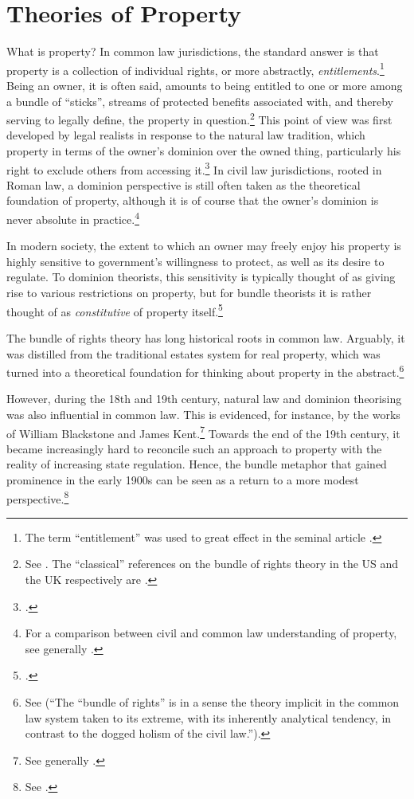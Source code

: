 \section{Theories of Property}\label{sec:top}

What is property? In common law jurisdictions, the standard answer is that property is a collection of individual rights, or more abstractly, {\it entitlements}.\footnote{The term ``entitlement'' was used to great effect in the seminal article \cite{calabresi72}.} Being an owner, it is often said, amounts to being entitled to one or more among a bundle of ``sticks'', streams of protected benefits associated with, and thereby serving to legally define, the property in question.\footnote{See \cite[357-358]{merrill01}. The ``classical'' references on the bundle of rights theory in the US and the UK respectively are \cite{hohfeld17,honore61}.} This point of view was first developed by legal realists in response to the natural law tradition, which  property in terms of the owner's dominion over the owned thing, particularly his right to exclude others from accessing it.\footcite[193-195]{klein11} In civil law jurisdictions, rooted in Roman law, a dominion perspective is still often taken as the theoretical foundation of property, although it is of course  that the owner's dominion is never absolute in practice.\footnote{For a comparison between civil and common law understanding of property, see generally \cite{chang12}.}

In modern society, the extent to which an owner may freely enjoy his property is highly sensitive to government's willingness to protect, as well as its desire to regulate. To dominion theorists, this sensitivity is typically thought of as giving rise to various restrictions on property, but for bundle theorists it is rather thought of as {\it constitutive} of property itself.\footcite[7]{chang12} 

The bundle of rights theory has long historical roots in common law. Arguably, it was distilled from the traditional estates system for real property, which was turned into a theoretical foundation for thinking about property in the abstract.\footnote{See \cite[7]{chang12}   
(``The ``bundle of rights'' is in a sense the theory implicit in the common law system taken to its extreme, with its inherently analytical tendency, in contrast to the dogged holism of the civil law.'').}

However, during the 18th and 19th century, natural law and dominion theorising was also influential in common law. This is evidenced, for instance, by the works of William Blackstone and James Kent.\footnote{See generally \cite{blackstone79b,kent27}.} Towards the end of the 19th century, it became increasingly hard to reconcile such an approach to property with the reality of increasing state regulation. Hence, the bundle metaphor that gained prominence in the early 1900s can be seen as a return to a more modest perspective.\footnote{See \cite[195]{klein11}.}

